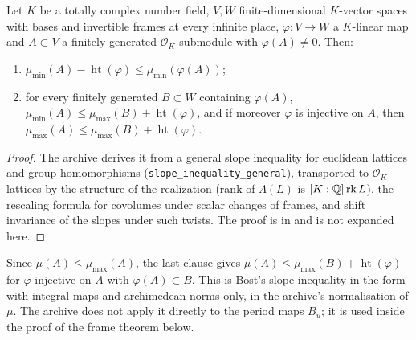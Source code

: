 \begin{theorem}\label{geoa:slope-ineq-mean}
Let $K$ be a totally complex number field, $V,W$ finite-dimensional $K$-vector spaces with
bases and invertible frames at every infinite place, $\varphi\colon V\to W$ a $K$-linear
map and $A\subset V$ a finitely generated $\mathcal O_K$-submodule with $\varphi(A)\ne0$.
Then:
\begin{enumerate}
\item $\mu_{\min}(A)-\operatorname{ht}(\varphi)\le\mu_{\min}(\varphi(A))$;
\item for every finitely generated $B\subset W$ containing $\varphi(A)$,
$\mu_{\min}(A)\le\mu_{\max}(B)+\operatorname{ht}(\varphi)$, and if moreover $\varphi$ is
injective on $A$, then $\mu_{\max}(A)\le\mu_{\max}(B)+\operatorname{ht}(\varphi)$.
\end{enumerate}
\end{theorem}
\begin{proof}
The archive derives it from a general slope inequality for euclidean lattices and
group homomorphisms (\texttt{slope\_inequality\_general}), transported to
$\mathcal O_K$-lattices by the structure of the realization (rank of $\Lambda(L)$ is
$[K:\mathbb{Q}]\operatorname{rk} L$), the rescaling formula for covolumes under scalar changes of frames, and
shift invariance of the slopes under such twists. The proof is in
 and is not expanded here.
\end{proof}

\begin{remark}\label{geoa:rem-bost}
Since $\mu(A)\le\mu_{\max}(A)$, the last clause gives
$\mu(A)\le\mu_{\max}(B)+\operatorname{ht}(\varphi)$ for $\varphi$ injective on $A$ with
$\varphi(A)\subset B$. This is Bost's slope inequality in the form with integral maps and
archimedean norms only, in the archive's normalisation of $\mu$. The archive does not
apply it directly to the period maps $B_u$; it is used inside the proof of the frame
theorem below.
\end{remark}


